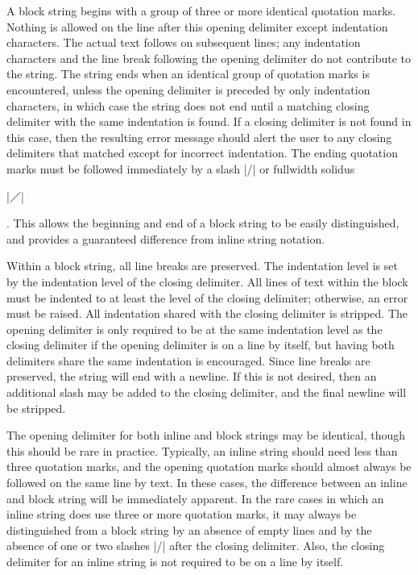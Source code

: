 \documentclass[11pt]{article}
\begin{document}
A block string begins with a group of three or more identical quotation marks.  Nothing is allowed on the line after this opening delimiter except indentation characters.  The actual text follows on subsequent lines; any indentation characters and the line break following the opening delimiter do not contribute to the string.  The string ends when an identical group of quotation marks is encountered, unless the opening delimiter is preceded by only indentation characters, in which case the string does not end until a matching closing delimiter with the same indentation is found.  If a closing delimiter is not found in this case, then the resulting error message should alert the user to any closing delimiters that matched except for incorrect indentation.  The ending quotation marks must be followed immediately by a slash |/| or fullwidth solidus \begin{CJK*}{UTF8}{gkai}|／|\end{CJK*}.  This allows the beginning and end of a block string to be easily distinguished, and provides a guaranteed difference from inline string notation.

Within a block string, all line breaks are preserved.  The indentation level is set by the indentation level of the closing delimiter.  All lines of text within the block must be indented to at least the level of the closing delimiter; otherwise, an error must be raised.  All indentation shared with the closing delimiter is stripped.  The opening delimiter is only required to be at the same indentation level as the closing delimiter if the opening delimiter is on a line by itself, but having both delimiters share the same indentation is encouraged.  Since line breaks are preserved, the string will end with a newline.  If this is not desired, then an additional slash may be added to the closing delimiter, and the final newline will be stripped.

The opening delimiter for both inline and block strings may be identical, though this should be rare in practice.  Typically, an inline string should need less than three quotation marks, and the opening quotation marks should almost always be followed on the same line by text.  In these cases, the difference between an inline and block string will be immediately apparent.  In the rare cases in which an inline string does use three or more quotation marks, it may always be distinguished from a block string by an absence of empty lines and by the absence of one or two slashes |/| after the closing delimiter.  Also, the closing delimiter for an inline string is not required to be on a line by itself.
\end{document}

